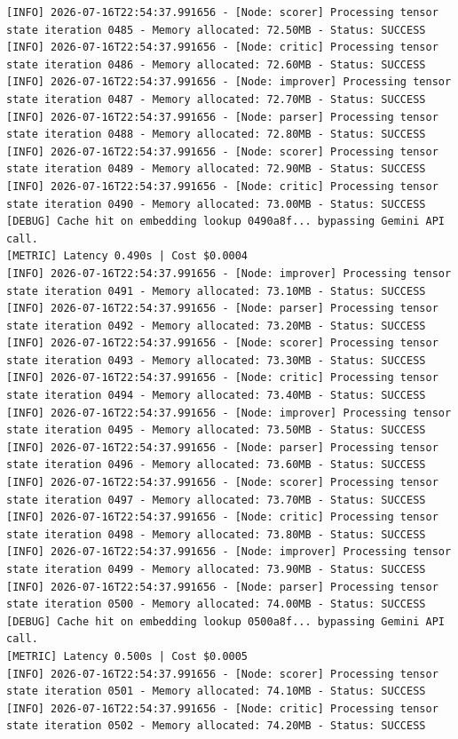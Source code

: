 \documentclass[10pt,journal,compsoc]{IEEEtran}
\begin{document}
\begin{verbatim}
[INFO] 2026-07-16T22:54:37.991656 - [Node: scorer] Processing tensor state iteration 0485 - Memory allocated: 72.50MB - Status: SUCCESS
[INFO] 2026-07-16T22:54:37.991656 - [Node: critic] Processing tensor state iteration 0486 - Memory allocated: 72.60MB - Status: SUCCESS
[INFO] 2026-07-16T22:54:37.991656 - [Node: improver] Processing tensor state iteration 0487 - Memory allocated: 72.70MB - Status: SUCCESS
[INFO] 2026-07-16T22:54:37.991656 - [Node: parser] Processing tensor state iteration 0488 - Memory allocated: 72.80MB - Status: SUCCESS
[INFO] 2026-07-16T22:54:37.991656 - [Node: scorer] Processing tensor state iteration 0489 - Memory allocated: 72.90MB - Status: SUCCESS
[INFO] 2026-07-16T22:54:37.991656 - [Node: critic] Processing tensor state iteration 0490 - Memory allocated: 73.00MB - Status: SUCCESS
[DEBUG] Cache hit on embedding lookup 0490a8f... bypassing Gemini API call.
[METRIC] Latency 0.490s | Cost $0.0004
[INFO] 2026-07-16T22:54:37.991656 - [Node: improver] Processing tensor state iteration 0491 - Memory allocated: 73.10MB - Status: SUCCESS
[INFO] 2026-07-16T22:54:37.991656 - [Node: parser] Processing tensor state iteration 0492 - Memory allocated: 73.20MB - Status: SUCCESS
[INFO] 2026-07-16T22:54:37.991656 - [Node: scorer] Processing tensor state iteration 0493 - Memory allocated: 73.30MB - Status: SUCCESS
[INFO] 2026-07-16T22:54:37.991656 - [Node: critic] Processing tensor state iteration 0494 - Memory allocated: 73.40MB - Status: SUCCESS
[INFO] 2026-07-16T22:54:37.991656 - [Node: improver] Processing tensor state iteration 0495 - Memory allocated: 73.50MB - Status: SUCCESS
[INFO] 2026-07-16T22:54:37.991656 - [Node: parser] Processing tensor state iteration 0496 - Memory allocated: 73.60MB - Status: SUCCESS
[INFO] 2026-07-16T22:54:37.991656 - [Node: scorer] Processing tensor state iteration 0497 - Memory allocated: 73.70MB - Status: SUCCESS
[INFO] 2026-07-16T22:54:37.991656 - [Node: critic] Processing tensor state iteration 0498 - Memory allocated: 73.80MB - Status: SUCCESS
[INFO] 2026-07-16T22:54:37.991656 - [Node: improver] Processing tensor state iteration 0499 - Memory allocated: 73.90MB - Status: SUCCESS
[INFO] 2026-07-16T22:54:37.991656 - [Node: parser] Processing tensor state iteration 0500 - Memory allocated: 74.00MB - Status: SUCCESS
[DEBUG] Cache hit on embedding lookup 0500a8f... bypassing Gemini API call.
[METRIC] Latency 0.500s | Cost $0.0005
[INFO] 2026-07-16T22:54:37.991656 - [Node: scorer] Processing tensor state iteration 0501 - Memory allocated: 74.10MB - Status: SUCCESS
[INFO] 2026-07-16T22:54:37.991656 - [Node: critic] Processing tensor state iteration 0502 - Memory allocated: 74.20MB - Status: SUCCESS

\end{verbatim}
\end{document}
